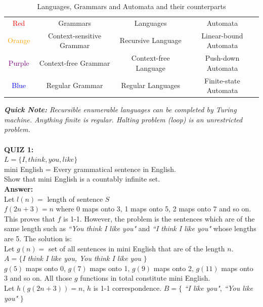 \documentclass[12pt,a4paper]{article}
\begin{document}
\begin{table}[H]

\begin{tabular}{|c|c|c|c|}
\hline 
\textcolor{red}{Red} & Grammars & Languages & Automata \\ 

\textcolor{orange}{Orange} & Context-sensitive Grammar & Recursive Language & Linear-bound Automata \\ 

\textcolor{purple}{Purple} & Context-free Grammar & Context-free Language & Push-down Automata \\ 

\textcolor{blue}{Blue} & Regular Grammar & Regular Languages & Finite-state Automata \\ 
\hline 
\end{tabular}
\caption{Languages, Grammars and Automata and their counterparts }
\end{table}

\indent \textit{\textbf{Quick Note:} Recursible enumerable languages can be completed by Turing machine. Anything finite is regular. Halting problem (loop) is an unrestricted problem.}\\\\

\noindent \textbf{\Large{QUIZ 1:}}\\
$L = \lbrace I, think, you, like \rbrace $\\
mini English = Every grammatical sentence in English.\\
Show that mini English is a countably infinite set.\\

\noindent \textbf{\Large{Answer:}}\\
Let $l(n) = $ length of sentence $S$\\
$f(2n+3) = n$ where 0 maps onto 3, 1 maps onto 5, 2 maps onto 7 and so on.\\
This proves that $f$ is 1-1. However, the problem is the sentences which are of the same length such as \textit{``You think I like you"} and \textit{``I think I like you"} whose lengths are 5. The solution is:\\
Let $g(n)=$ set of all sentences in mini English that are of the length $n$.\\
$A = \lbrace$\textit{I think I like you, You think I like you} $\rbrace$\\
$g(5)$ maps onto 0, $g(7)$ maps onto 1, $g(9)$ maps onto 2, $g(11)$ maps onto 3 and so on. All those $g$ functions in total constitute mini English.\\
Let $h(g(2n+3)) = n$, $h$ is 1-1 correspondence. $B = \lbrace$ \textit{``I like you"}, \textit{``You like you"} $\rbrace$\\
\end{document}
